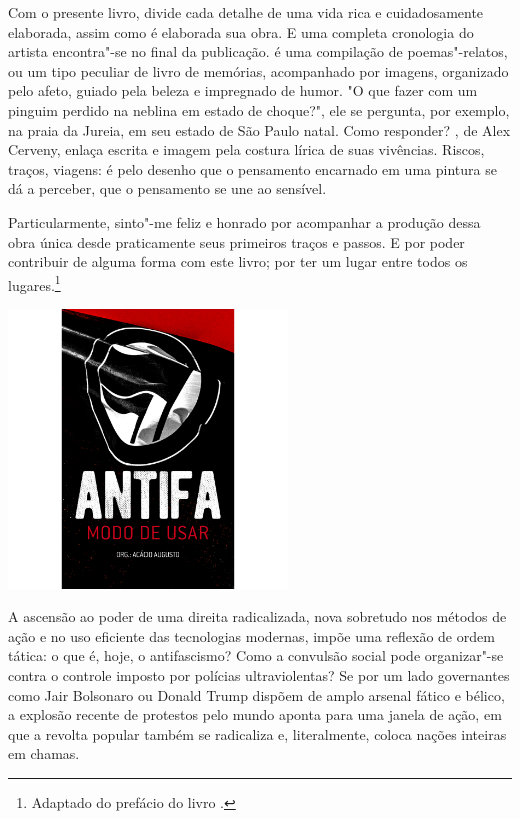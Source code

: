 Com o presente livro, divide cada detalhe de uma vida rica e cuidadosamente elaborada, assim como é elaborada sua obra. E uma completa cronologia do artista encontra"-se no final da publicação. {} é uma compilação de poemas"-relatos, ou um tipo peculiar de livro de memórias, acompanhado por imagens, organizado pelo afeto, guiado pela beleza e impregnado de humor. "O que fazer com um pinguim perdido na neblina em estado de choque?", ele se pergunta, por exemplo, na praia da Jureia, em seu estado de São Paulo natal. Como responder? {}, de Alex Cerveny, enlaça escrita e imagem pela costura lírica de suas vivências. Riscos, traços, viagens: é pelo desenho que o pensamento encarnado em uma pintura se dá a perceber, que o pensamento se une ao sensível. 

Particularmente, sinto"-me feliz e honrado por acompanhar a produção dessa obra única desde praticamente seus primeiros traços e passos. E por poder contribuir de alguma forma com este livro; por ter um lugar entre todos os lugares.\footnote{Adaptado do prefácio do livro {}.}

\pagebreak %

\begin{center}
\hspace*{-3.6cm}
\hspace*{3.1cm}\includegraphics[width=74mm]{./grid/antifa.png}
\end{center}

\hspace*{-7cm}\hrulefill\hspace*{-7cm}

\medskip

\noindent{}A ascensão ao poder de uma direita radicalizada, nova sobretudo nos métodos de ação e no uso eficiente das tecnologias modernas, impõe uma reflexão de ordem tática: o que é, hoje, o antifascismo? Como a convulsão social pode organizar"-se contra o controle imposto por polícias ultraviolentas?
Se por um lado governantes como Jair Bolsonaro ou Donald Trump dispõem de amplo arsenal fático e bélico, a explosão recente de protestos pelo mundo aponta para uma janela de ação, em que a revolta popular também se radicaliza e, literalmente, coloca nações inteiras em chamas.

